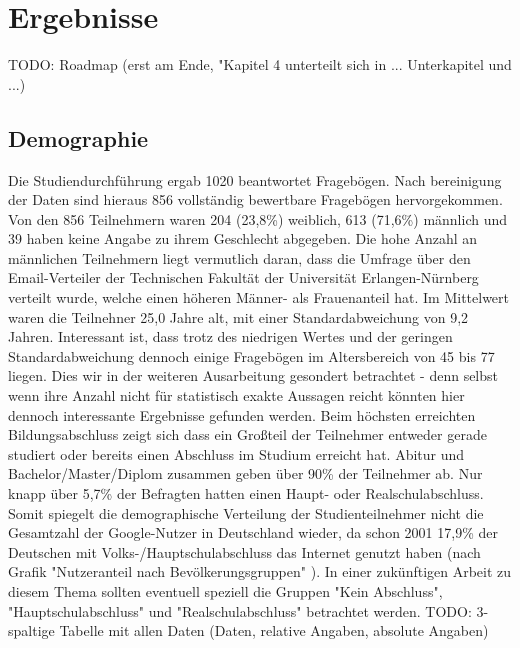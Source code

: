 %
% 

\chapter{Ergebnisse}

TODO: Roadmap (erst am Ende, "Kapitel 4 unterteilt sich in ... Unterkapitel und ...)

\section{Demographie}
Die Studiendurchführung ergab 1020 beantwortet Fragebögen. Nach bereinigung der Daten sind hieraus 856 vollständig bewertbare Fragebögen hervorgekommen.
Von den 856 Teilnehmern waren 204 (23,8\%) weiblich, 613 (71,6\%) männlich und 39 haben keine Angabe zu ihrem Geschlecht abgegeben. Die hohe Anzahl an männlichen Teilnehmern liegt vermutlich daran, dass die Umfrage über den Email-Verteiler der Technischen Fakultät der Universität Erlangen-Nürnberg verteilt wurde, welche einen höheren Männer- als Frauenanteil hat.
Im Mittelwert waren die Teilnehner 25,0 Jahre alt, mit einer Standardabweichung von 9,2 Jahren.
Interessant ist, dass trotz des niedrigen Wertes und der geringen Standardabweichung dennoch einige Fragebögen im Altersbereich von 45 bis 77 liegen. Dies wir in der weiteren Ausarbeitung gesondert betrachtet - denn selbst wenn ihre Anzahl nicht für statistisch exakte Aussagen reicht könnten hier dennoch interessante Ergebnisse gefunden werden.
Beim höchsten erreichten Bildungsabschluss zeigt sich dass ein Großteil der Teilnehmer entweder gerade studiert oder bereits einen Abschluss im Studium erreicht hat. Abitur und Bachelor/Master/Diplom zusammen geben über 90\% der Teilnehmer ab. Nur knapp über 5,7\% der Befragten hatten einen Haupt- oder Realschulabschluss.
Somit spiegelt die demographische Verteilung der Studienteilnehmer nicht die Gesamtzahl der Google-Nutzer in Deutschland wieder, da schon 2001 17,9\% der Deutschen mit Volks-/Hauptschulabschluss das Internet genutzt haben (nach Grafik "Nutzeranteil nach Bevölkerungsgruppen" \cite{ard2001internetusage}). In einer zukünftigen Arbeit zu diesem Thema sollten eventuell speziell die Gruppen "Kein Abschluss", "Hauptschulabschluss" und "Realschulabschluss" betrachtet werden.
TODO: 3-spaltige Tabelle mit allen Daten (Daten, relative Angaben, absolute Angaben)
